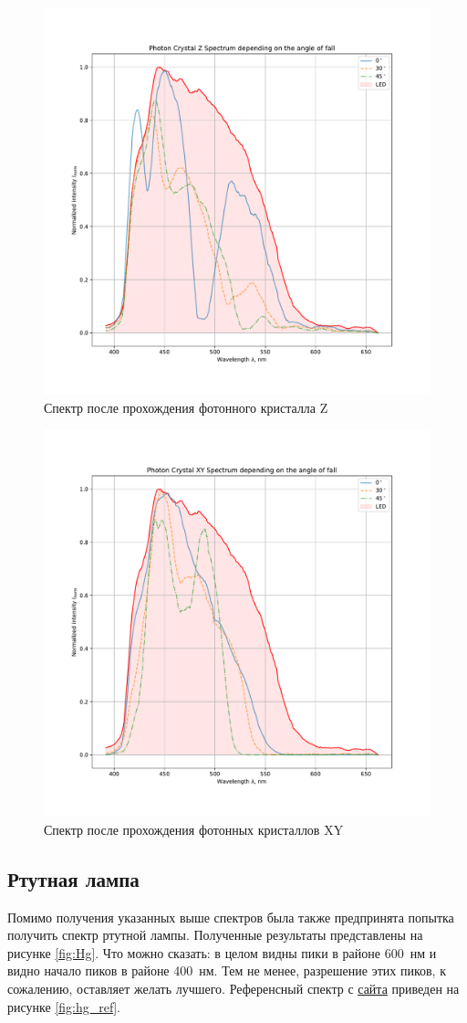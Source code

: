 \documentclass[a4paper, 12pt]{article}
\begin{document}
\begin{figure}[H]
	\centering
	\includegraphics[width=0.7\linewidth]{z.pdf}
	\caption{Спектр после прохождения фотонного кристалла Z}
	\label{fig:z}
\end{figure}

\begin{figure}[H]
	\centering
	\includegraphics[width=0.7\linewidth]{xy.pdf}
	\caption{Спектр после прохождения фотонных кристаллов XY}
	\label{fig:xy}
\end{figure}

\subsection{Ртутная лампа}

Помимо получения указанных выше спектров была также предпринята попытка получить спектр ртутной лампы. Полученные результаты представлены на рисунке \ref{fig:Hg}. Что можно сказать: в целом видны пики в районе 600~нм и видно начало пиков в районе 400~нм. Тем не менее, разрешение этих пиков, к сожалению, оставляет желать лучшего. Референсный спектр с \href{http://zeiss-campus.magnet.fsu.edu/articles/lightsources/mercuryarc.html}{сайта} приведен на рисунке \ref{fig:hg_ref}.
\end{document}
